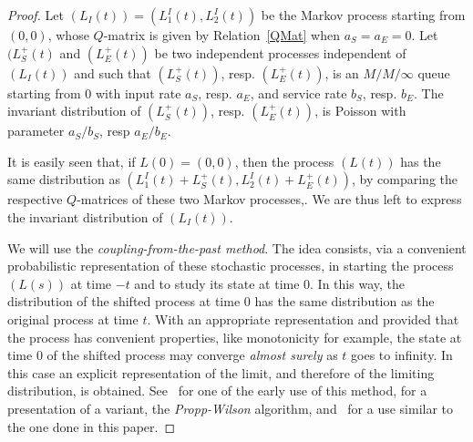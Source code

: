 \documentclass[english]{amsart}
\numberwithin{proposition}{section}
\begin{document}
\begin{proof}
  Let $(L_I(t)){=}(L_1^I(t),L_2^I(t))$ be the Markov process starting from $(0,0)$, whose $Q$-matrix is given by Relation~\eqref{QMat} when $a_S{=}a_E{=}0$. Let $(L_S^+(t)$ and $(L_E^+(t))$ be two independent processes independent of $(L_I(t))$ and such that $(L_S^+(t))$, resp. $(L_E^+(t))$,  is an $M/M/\infty$ queue starting from $0$  with input rate $a_S$, resp.  $a_E$, and service rate $b_S$, resp. $b_E$. The invariant distribution of $(L_S^+(t))$, resp. $(L_E^+(t))$, is Poisson with parameter $a_S/b_S$, resp $a_E/b_E$. 

It is easily seen that, if $L(0){=}(0,0)$, then the process  $(L(t))$ has the same distribution as $(L_1^I(t){+}L_S^+(t),L_2^I(t){+}L_E^+(t))$,  by comparing the respective $Q$-matrices of these two Markov processes,. We are thus left to express the invariant distribution of $(L_I(t))$.

We will use the {\em coupling-from-the-past method}. The idea consists, via a convenient probabilistic representation of these stochastic processes,  in starting the process $(L(s))$ at time ${-}t$ and to study its state at time $0$. In this way, the distribution of the shifted process at time $0$ has the same distribution as the original process at time $t$. With an appropriate representation and provided that the process has convenient properties, like monotonicity for example, the state at time $0$ of the shifted process may converge {\em almost surely} as $t$ goes to inﬁnity.  In this case an explicit representation of the limit, and therefore of the limiting distribution,  is obtained.  See~\citet{Loynes} for one of the early use of this method, \citet{Peres} for a presentation of a variant, the {\em Propp-Wilson} algorithm,  and~\citet{Rob2019} for a use similar to the one done in this paper.   


\end{proof}
\end{document}
